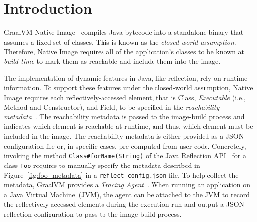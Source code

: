 \chapter{Introduction}





GraalVM Native Image~\cite{noauthor_native_nodate} compiles Java bytecode into a standalone binary that assumes a fixed set of classes. This is known as the \emph{closed-world assumption}. Therefore, Native Image requires all of the application's classes to be known at \emph{build time} to mark them as reachable and include them into the image.

The implementation of dynamic features in Java, like reflection, rely on runtime information. To support these features under the closed-world assumption, Native Image requires each reflectively-accessed element, that is Class, \emph{Executable} (i.e., Method and Constructor), and Field, to be specified in the \emph{reachability metadata}~\cite{noauthor_reachability_nodate}. 
The reachability metadata is passed to the image-build process and indicates which element is reachable at runtime, and thus, which element must be included in the image. 
The reachability metadata is either provided as a JSON configuration file or, in specific cases, pre-computed from user-code. 
Concretely, invoking the method \verb|Class#forName(String)| of the Java Reflection API~\cite{noauthor_core_nodate} for a class \verb|Foo| requires to manually specify the metadata described in Figure~\ref{fig:foo_metadata} in a \verb|reflect-config.json| file.
To help collect the metadata, GraalVM provides a \emph{Tracing Agent}~\cite{noauthor_collect_nodate}. When running an application on a Java Virtual Machine~(JVM), the agent can be attached to the JVM to record the reflectively-accessed elements during the execution run and output a JSON reflection configuration to pass to the image-build process.

